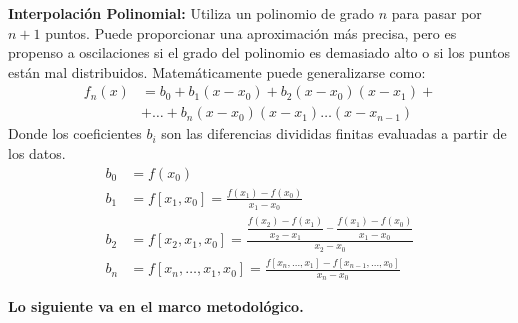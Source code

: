 \textbf{Interpolación Polinomial:} Utiliza un polinomio de grado $n$ para pasar por $n+1$ puntos. Puede proporcionar una aproximación más precisa, pero es propenso a oscilaciones si el grado del polinomio es demasiado alto o si los puntos están mal distribuidos. Matemáticamente puede generalizarse como:
\begin{align*}
    f_n(x) &= b_0 + b_1(x - x_0) + b_2(x - x_0)(x - x_1)+ \\
           &+ \ldots + b_n(x - x_0)(x - x_1) \ldots (x - x_{n-1})
\end{align*}
Donde los coeficientes $b_i$ son las diferencias divididas finitas evaluadas a partir de los datos.
\begin{align*}
    b_0 &= f(x_0) \\
    b_1 &= f[x_1, x_0] = \frac{f(x_1) - f(x_0)}{x_1 - x_0} \\
    b_2 &= f[x_2, x_1, x_0] = \frac{\dfrac{f(x_2) - f(x_1)}{x_2 - x_1} - \dfrac{f(x_1) - f(x_0)}{x_1 - x_0}}{x_2 - x_0} \\
    b_n &= f[x_n, \ldots, x_1, x_0] = \frac{f[x_n, \ldots, x_1] - f[x_{n-1}, \ldots, x_0]}{x_n - x_0}
\end{align*}














\textbf{Lo siguiente va en el marco metodológico.}

